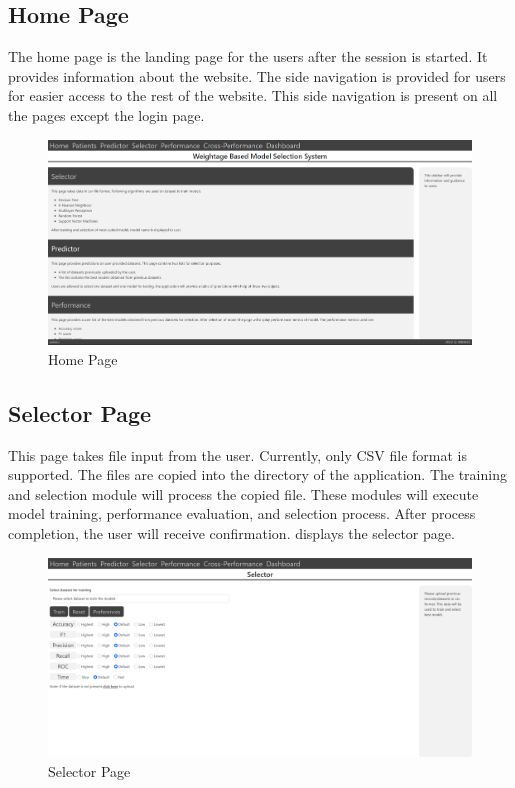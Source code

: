 \subsection{Home Page} \label{subsec:home_page}
The home page is the landing page for the users after the session is started. It provides information about the website. The side navigation is provided for users for easier access to the rest of the website. This side navigation is present on all the pages except the login page.

\begin{figure}[H]
  \centering
  \includegraphics[width=0.7\columnwidth]{media/website/pages/home.png}
  \caption{Home Page}
  \label{fig:home_page}
\end{figure}

\FloatBarrier
\subsection{Selector Page} \label{subsec:selector_page}
This page takes file input from the user. Currently, only CSV file format is supported. The files are copied into the directory of the application. The training and selection module will process the copied file. These modules will execute model training, performance evaluation, and selection process. After process completion, the user will receive confirmation.  displays the selector page.

\begin{figure}[H]
  \centering
  \includegraphics[width=0.7\columnwidth]{media/website/pages/selector.png}
  \caption{Selector Page}
  \label{fig:web_selector_page}
\end{figure}

